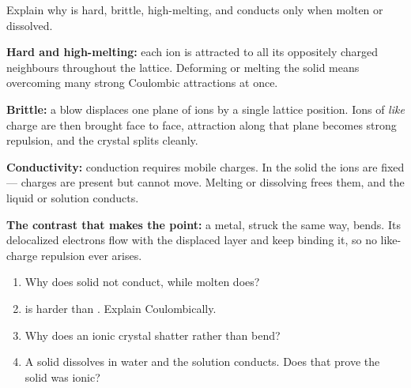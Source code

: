 \documentclass{apchem-worksheet}
\begin{document}
\begin{workedexample}
Explain why  is hard, brittle, high-melting, and conducts only
when molten or dissolved.

\textbf{Hard and high-melting:} each ion is attracted to all its
oppositely charged neighbours throughout the lattice. Deforming or melting
the solid means overcoming many strong Coulombic attractions at once.

\textbf{Brittle:} a blow displaces one plane of ions by a single lattice
position. Ions of \emph{like} charge are then brought face to face,
attraction along that plane becomes strong repulsion, and the crystal
splits cleanly.

\textbf{Conductivity:} conduction requires mobile charges. In the solid
the ions are fixed --- charges are present but cannot move. Melting or
dissolving frees them, and the liquid or solution conducts.

\textbf{The contrast that makes the point:} a metal, struck the same way,
bends. Its delocalized electrons flow with the displaced layer and keep
binding it, so no like-charge repulsion ever arises.
\end{workedexample}

\begin{yourturn}
\begin{enumerate}[leftmargin=*,itemsep=0.5em]
  \item Why does solid  not conduct, while molten  does?
        \workspace[1.6cm]
  \item {} is harder than . Explain Coulombically.
        \workspace[1.8cm]
  \item Why does an ionic crystal shatter rather than bend?
        \workspace[1.8cm]
  \item A solid dissolves in water and the solution conducts. Does that
        prove the solid was ionic? \workspace[1.8cm]
\end{enumerate}
\end{yourturn}
\end{document}
